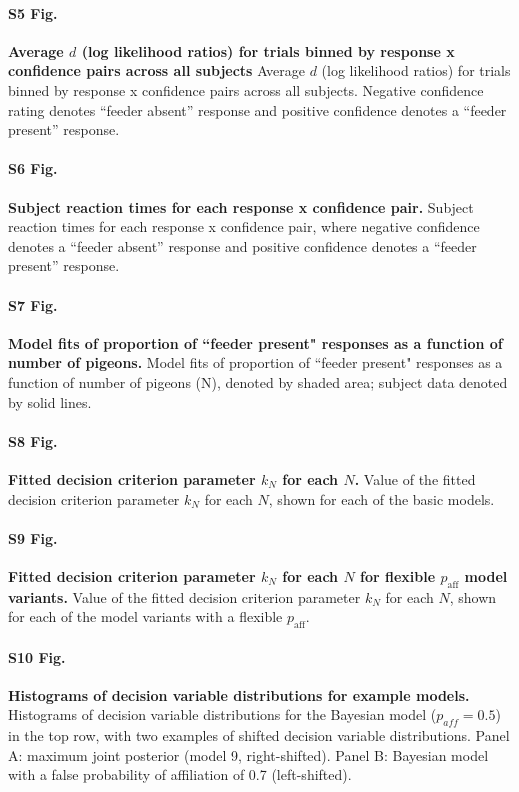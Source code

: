 \documentclass{article}
\begin{document}
\paragraph*{S5 Fig.}
\label{S5_Fig}
{\bf Average $d$ (log likelihood ratios) for trials binned by response x confidence pairs across all subjects }Average $d$ (log likelihood ratios) for trials binned by response x confidence pairs across all subjects. Negative confidence rating denotes ``feeder absent'' response and positive confidence denotes a ``feeder present'' response.

\paragraph*{S6 Fig.}
\label{S6_Fig}
{\bf Subject reaction times for each response x confidence pair. }Subject reaction times for each response x confidence pair, where negative confidence denotes a ``feeder absent'' response and positive confidence denotes a ``feeder present'' response.


\paragraph*{S7 Fig.}
\label{S7_Fig}
{\bf Model fits of proportion of ``feeder present" responses as a function of number of pigeons. }
Model fits of proportion of ``feeder present" responses as a function of number of pigeons (N), denoted by shaded area; subject data denoted by solid lines.

\paragraph*{S8 Fig.}
\label{S8_Fig}
{\bf Fitted decision criterion parameter $k_N$ for each $N$. }Value of the fitted decision criterion parameter $k_N$ for each $N$, shown for each of the basic models.


\paragraph*{S9 Fig.}
\label{S9_Fig}
{\bf Fitted decision criterion parameter $k_N$ for each $N$ for flexible $p_{\text{aff}}$ model variants. }Value of the fitted decision criterion parameter $k_N$ for each $N$, shown for each of the model variants with a flexible $p_{\text{aff}}$.

\paragraph*{S10 Fig.}
\label{S10_Fig}
{\bf Histograms of decision variable distributions for example models. }Histograms of decision variable distributions for the Bayesian model ($p_{aff} = 0.5$) in the top row, with two examples of shifted decision variable distributions. Panel A: maximum joint posterior (model 9, right-shifted). Panel B:  Bayesian model with a false probability of affiliation of 0.7 (left-shifted).
\end{document}
